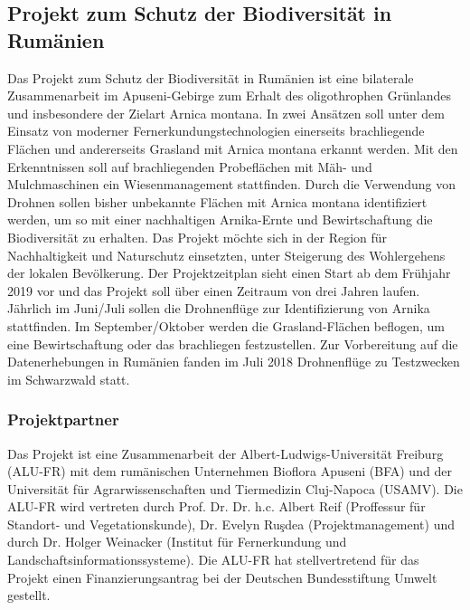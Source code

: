 \subsection{Projekt zum Schutz der Biodiversität in Rumänien}

Das Projekt zum Schutz der Biodiversität in Rumänien ist eine bilaterale Zusammenarbeit im Apuseni-Gebirge zum Erhalt des oligothrophen Grünlandes und insbesondere der Zielart Arnica montana. In zwei Ansätzen soll unter dem Einsatz von moderner Fernerkundungstechnologien einerseits brachliegende Flächen und andererseits Grasland mit Arnica montana erkannt werden. Mit den Erkenntnissen soll auf brachliegenden Probeflächen mit Mäh- und Mulchmaschinen ein Wiesenmanagement stattfinden. Durch die Verwendung von Drohnen sollen bisher unbekannte Flächen mit Arnica montana identifiziert werden, um so mit einer nachhaltigen Arnika-Ernte und Bewirtschaftung die Biodiversität zu erhalten. Das Projekt möchte sich in der Region für Nachhaltigkeit und Naturschutz einsetzten, unter Steigerung des Wohlergehens der lokalen Bevölkerung. Der Projektzeitplan sieht einen Start ab dem Frühjahr 2019 vor und das Projekt soll über einen Zeitraum von drei Jahren laufen. Jährlich im Juni/Juli sollen die Drohnenflüge zur Identifizierung von Arnika stattfinden. Im September/Oktober werden die Grasland-Flächen beflogen, um eine Bewirtschaftung oder das brachliegen festzustellen. Zur Vorbereitung auf die Datenerhebungen in Rumänien fanden im Juli 2018 Drohnenflüge zu Testzwecken im Schwarzwald statt.

\subsubsection{Projektpartner}
Das Projekt ist eine Zusammenarbeit der Albert-Ludwigs-Universität Freiburg (ALU-FR) mit dem rumänischen Unternehmen Bioflora Apuseni (BFA) und der Universität für Agrarwissenschaften und Tiermedizin Cluj-Napoca (USAMV). Die ALU-FR wird vertreten durch Prof. Dr. Dr. h.c. Albert Reif (Proffessur für Standort- und Vegetationskunde), Dr. Evelyn Ruşdea  (Projektmanagement) und durch Dr. Holger Weinacker (Institut für Fernerkundung und Landschaftsinformationssysteme). Die ALU-FR hat stellvertretend für das Projekt einen Finanzierungsantrag bei der Deutschen Bundesstiftung Umwelt gestellt.

